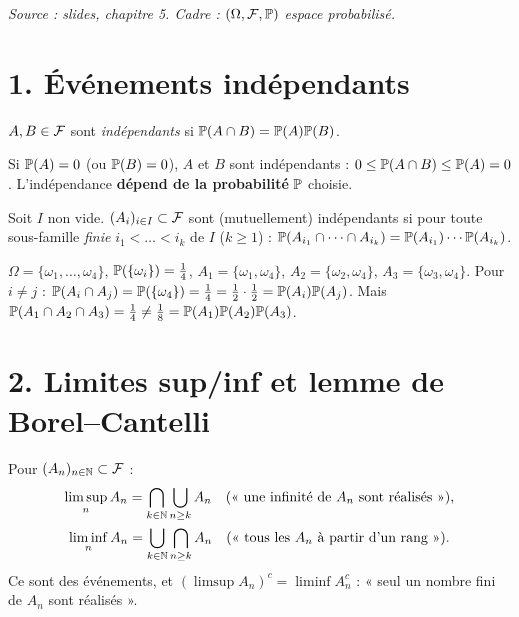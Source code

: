 \documentclass[11pt,a4paper]{article}
\begin{document}

\textit{Source : slides, chapitre 5. Cadre : $(\Omega,\mathcal{F},\mathbb{P})$ espace probabilisé.}

\section*{1. Événements indépendants}

\begin{definition}\label{C3:deux-ev}
$A,B\in\mathcal{F}$ sont \emph{indépendants} si $\mathbb{P}(A\cap B)=\mathbb{P}(A)\mathbb{P}(B)$.
\end{definition}
\begin{remarque}
Si $\mathbb{P}(A)=0$ (ou $\mathbb{P}(B)=0$), $A$ et $B$ sont indépendants : $0\le\mathbb{P}(A\cap B)\le\mathbb{P}(A)=0$.
L'indépendance \textbf{dépend de la probabilité} $\mathbb{P}$ choisie.
\end{remarque}

\begin{definition}\label{C3:mutuelle}
Soit $I$ non vide. $(A_i)_{i\in I}\subset\mathcal{F}$ sont (mutuellement) indépendants si pour toute sous-famille \emph{finie}
$i_1<\dots<i_k$ de $I$ ($k\ge1$) :
$\mathbb{P}(A_{i_1}\cap\dots\cap A_{i_k})=\mathbb{P}(A_{i_1})\cdots\mathbb{P}(A_{i_k})$.
\end{definition}

\begin{exemple}\label{C3:ex-2a2}
$\Omega=\{\omega_1,\dots,\omega_4\}$, $\mathbb{P}(\{\omega_i\})=\frac14$, $A_1=\{\omega_1,\omega_4\}$, $A_2=\{\omega_2,\omega_4\}$,
$A_3=\{\omega_3,\omega_4\}$. Pour $i\ne j$ : $\mathbb{P}(A_i\cap A_j)=\mathbb{P}(\{\omega_4\})=\frac14=\frac12\cdot\frac12=\mathbb{P}(A_i)\mathbb{P}(A_j)$.
Mais $\mathbb{P}(A_1\cap A_2\cap A_3)=\frac14\neq\frac18=\mathbb{P}(A_1)\mathbb{P}(A_2)\mathbb{P}(A_3)$.
\end{exemple}

\section*{2. Limites sup/inf et lemme de Borel--Cantelli}

\begin{definition}\label{C3:limsup}
Pour $(A_n)_{n\in\mathbb{N}}\subset\mathcal{F}$ :
\begin{gather*}\limsup_n A_n=\bigcap_{k\in\mathbb{N}}\bigcup_{n\ge k}A_n \quad(\text{« une infinité de }A_n\text{ sont réalisés »}),\\
\liminf_n A_n=\bigcup_{k\in\mathbb{N}}\bigcap_{n\ge k}A_n \quad(\text{« tous les }A_n\text{ à partir d'un rang »}).\end{gather*}
Ce sont des événements, et $(\limsup A_n)^c=\liminf A_n^c$ : « seul un nombre fini de $A_n$ sont réalisés ».
\end{definition}
\end{document}
